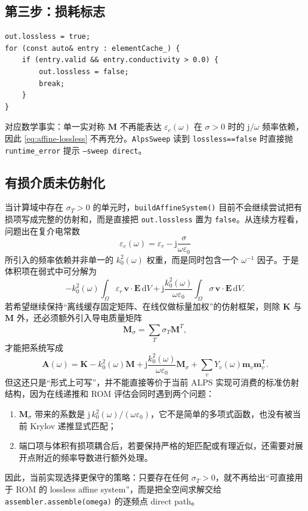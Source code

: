\documentclass[UTF8,a4paper,11pt]{ctexart}
\newcommand{\dd}{\mathrm{d}}
\newcommand{\jj}{\mathrm{j}}
\newcommand{\transpose}{\mathsf{T}}
\newcommand{\code}[1]{\texttt{\small #1}}
\begin{document}
\subsection{第三步：损耗标志}
\label{sec:lossless-flag}

\begin{lstlisting}
out.lossless = true;
for (const auto& entry : elementCache_) {
    if (entry.valid && entry.conductivity > 0.0) {
        out.lossless = false;
        break;
    }
}
\end{lstlisting}
对应数学事实：单一实对称 $\bm M$ 不再能表达 $\varepsilon_c(\omega)$ 在 $\sigma>0$ 时的
$\jj/\omega$ 频率依赖，因此 \eqref{eq:affine-lossless} 不再充分。\code{AlpsSweep}
读到 \code{lossless==false} 时直接抛 \code{runtime\_error} 提示 \code{--sweep direct}。

\subsection{有损介质未仿射化}
\label{sec:lossy-nonaffine}

当计算域中存在 $\sigma_T>0$ 的单元时，\code{buildAffineSystem()} 目前不会继续尝试把有损项写成完整的仿射和，而是直接把 \code{out.lossless} 置为 \code{false}。从连续方程看，问题出在复介电常数
\begin{equation}
    \varepsilon_c(\omega)=\varepsilon_r-\jj\frac{\sigma}{\omega\varepsilon_0}
\end{equation}
所引入的频率依赖并非单一的 $k_0^2(\omega)$ 权重，而是同时包含一个 $\omega^{-1}$ 因子。于是体积项在弱式中可分解为
\begin{equation}
    -k_0^2(\omega)\int_\Omega \varepsilon_r\,\bm v\cdot\bm E\,\dd V
    +\jj\frac{k_0^2(\omega)}{\omega\varepsilon_0}
    \int_\Omega \sigma\,\bm v\cdot\bm E\,\dd V.
\end{equation}
若希望继续保持“离线缓存固定矩阵、在线仅做标量加权”的仿射框架，则除 $\bm K$ 与 $\bm M$ 外，还必须额外引入导电质量矩阵
\begin{equation}
    \bm M_\sigma=\sum_T \sigma_T\bm M^T,
\end{equation}
才能把系统写成
\begin{equation}
    \bm A(\omega)=\bm K-k_0^2(\omega)\bm M+\jj\frac{k_0^2(\omega)}{\omega\varepsilon_0}\bm M_\sigma
    +\sum_vY_v(\omega)\bm m_v\bm m_v^{\transpose}.
    \label{eq:lossy-affine-expanded}
\end{equation}
但这还只是“形式上可写”，并不能直接等价于当前 ALPS 实现可消费的标准仿射结构，因为在线递推和 ROM 评估会同时遇到两个问题：
\begin{enumerate}[leftmargin=2em]
\item $\bm M_\sigma$ 带来的系数是 $\jj\,k_0^2(\omega)/(\omega\varepsilon_0)$，它不是简单的多项式函数，也没有被当前 Krylov 递推显式匹配；
\item 端口项与体积有损项耦合后，若要保持严格的矩匹配或有理近似，还需要对展开点附近的频率导数进行额外处理。
\end{enumerate}
因此，当前实现选择更保守的策略：只要存在任何 $\sigma_T>0$，就不再给出“可直接用于 ROM 的 lossless affine system”，而是把全空间求解交给 \code{assembler.assemble(omega)} 的逐频点 direct path。
\end{document}
